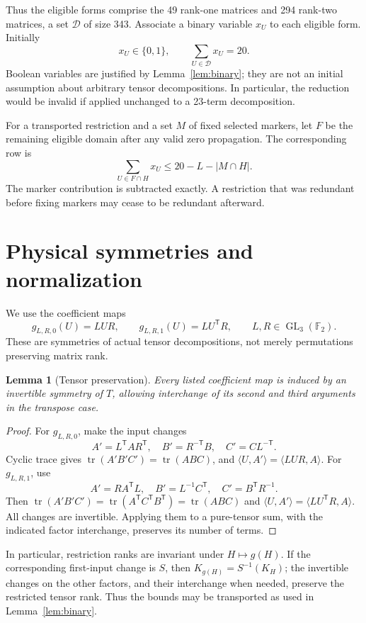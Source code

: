 \documentclass[11pt]{article}
\newcommand{\F}{\mathbb F_2}
\newcommand{\GL}{\operatorname{GL}_3(\F)}
\newcommand{\tr}{\operatorname{tr}}
\newtheorem{lemma}[theorem]{Lemma}
\theoremstyle{definition}
\begin{document}
Thus the eligible forms comprise the 49 rank-one matrices and 294 rank-two matrices, a set $\mathcal D$ of size 343. Associate a binary variable $x_U$ to each eligible form. Initially
\[
 x_U\in\{0,1\},\qquad \sum_{U\in\mathcal D}x_U=20.
\]
Boolean variables are justified by Lemma~\ref{lem:binary}; they are not an initial assumption about arbitrary tensor decompositions. In particular, the reduction would be invalid if applied unchanged to a 23-term decomposition.

For a transported restriction and a set $M$ of fixed selected markers, let $F$ be the remaining eligible domain after any valid zero propagation. The corresponding row is
\begin{equation}\label{eq:projected}
 \sum_{U\in F\cap H}x_U\leq20-L-|M\cap H|.
\end{equation}
The marker contribution is subtracted exactly. A restriction that was redundant before fixing markers may cease to be redundant afterward.

\section{Physical symmetries and normalization}\label{sec:symmetry}
We use the coefficient maps
\[
 g_{L,R,0}(U)=LUR,\qquad g_{L,R,1}(U)=LU^{\mathsf T}R,
 \qquad L,R\in\GL.
\]
These are symmetries of actual tensor decompositions, not merely permutations preserving matrix rank.

\begin{lemma}[Tensor preservation]\label{lem:physical}
Every listed coefficient map is induced by an invertible symmetry of $T$, allowing interchange of its second and third arguments in the transpose case.
\end{lemma}
\begin{proof}
For $g_{L,R,0}$, make the input changes
\[
 A'=L^{\mathsf T}AR^{\mathsf T},\quad
 B'=R^{-\mathsf T}B,\quad C'=CL^{-\mathsf T}.
\]
Cyclic trace gives $\tr(A'B'C')=\tr(ABC)$, and
$\langle U,A'\rangle=\langle LUR,A\rangle$.
For $g_{L,R,1}$, use
\[
 A'=RA^{\mathsf T}L,\quad B'=L^{-1}C^{\mathsf T},\quad
 C'=B^{\mathsf T}R^{-1}.
\]
Then $\tr(A'B'C')=\tr(A^{\mathsf T}C^{\mathsf T}B^{\mathsf T})=\tr(ABC)$ and
$\langle U,A'\rangle=\langle LU^{\mathsf T}R,A\rangle$.
All changes are invertible. Applying them to a pure-tensor sum, with the indicated factor interchange, preserves its number of terms.
\end{proof}

In particular, restriction ranks are invariant under $H\mapsto g(H)$. If the corresponding first-input change is $S$, then $K_{g(H)}=S^{-1}(K_H)$; the invertible changes on the other factors, and their interchange when needed, preserve the restricted tensor rank. Thus the bounds may be transported as used in Lemma~\ref{lem:binary}.
\end{document}
